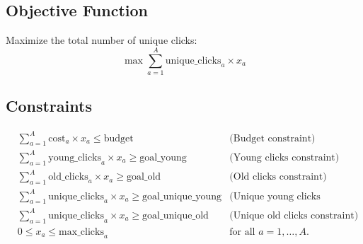 \documentclass{article}
\begin{document}
\subsection*{Objective Function}
Maximize the total number of unique clicks:
\[
\max \sum_{a=1}^{A} \text{unique\_clicks}_{a} \times x_{a}
\]

\subsection*{Constraints}
\begin{align*}
    & \sum_{a=1}^{A} \text{cost}_{a} \times x_{a} \leq \text{budget} & \text{(Budget constraint)} \\
    & \sum_{a=1}^{A} \text{young\_clicks}_{a} \times x_{a} \geq \text{goal\_young} & \text{(Young clicks constraint)} \\
    & \sum_{a=1}^{A} \text{old\_clicks}_{a} \times x_{a} \geq \text{goal\_old} & \text{(Old clicks constraint)} \\
    & \sum_{a=1}^{A} \text{unique\_clicks}_{a} \times x_{a} \geq \text{goal\_unique\_young} & \text{(Unique young clicks constraint)} \\
    & \sum_{a=1}^{A} \text{unique\_clicks}_{a} \times x_{a} \geq \text{goal\_unique\_old} & \text{(Unique old clicks constraint)} \\
    & 0 \leq x_{a} \leq \text{max\_clicks}_{a} & \text{for all } a = 1, \ldots, A.
\end{align*}
\end{document}
